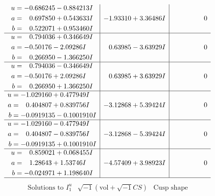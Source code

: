 \documentclass[1p]{elsarticle_modified}
\theoremstyle{definition}
\newcommand{\I}{\sqrt{-1}}
\begin{document}
$$\begin{array}{c|c|c}
\begin{aligned}
u &= -0.686245 - 0.884213 I \\
a &= \phantom{-}0.697850 + 0.543633 I \\
b &= \phantom{-}0.522071 + 0.953460 I\end{aligned}
 & -1.93310 + 3.36486 I & \phantom{-0.000000 } 0 \\ \hline\begin{aligned}
u &= \phantom{-}0.794036 + 0.346649 I \\
a &= -0.50176 - 2.09286 I \\
b &= \phantom{-}0.266950 - 1.366250 I\end{aligned}
 & \phantom{-}0.63985 - 3.63929 I & \phantom{-0.000000 } 0 \\ \hline\begin{aligned}
u &= \phantom{-}0.794036 - 0.346649 I \\
a &= -0.50176 + 2.09286 I \\
b &= \phantom{-}0.266950 + 1.366250 I\end{aligned}
 & \phantom{-}0.63985 + 3.63929 I & \phantom{-0.000000 } 0 \\ \hline\begin{aligned}
u &= -1.029160 + 0.477949 I \\
a &= \phantom{-}0.404807 + 0.839756 I \\
b &= -0.0919135 - 0.1001910 I\end{aligned}
 & -3.12868 + 5.39424 I & \phantom{-0.000000 } 0 \\ \hline\begin{aligned}
u &= -1.029160 - 0.477949 I \\
a &= \phantom{-}0.404807 - 0.839756 I \\
b &= -0.0919135 + 0.1001910 I\end{aligned}
 & -3.12868 - 5.39424 I & \phantom{-0.000000 } 0 \\ \hline\begin{aligned}
u &= \phantom{-}0.859021 + 0.068455 I \\
a &= \phantom{-}1.28643 + 1.53746 I \\
b &= -0.024971 + 1.198640 I\end{aligned}
 & -4.57409 + 3.98923 I & \phantom{-0.000000 } 0\\
 \hline 
 \end{array}$$\newpage$$\begin{array}{c|c|c}  
\text{Solutions to }I^u_{1}& \I (\text{vol} + \sqrt{-1}CS) & \text{Cusp shape}\\
 \hline 
\begin{aligned}

\end{aligned}
\end{array}$$
\end{document}
